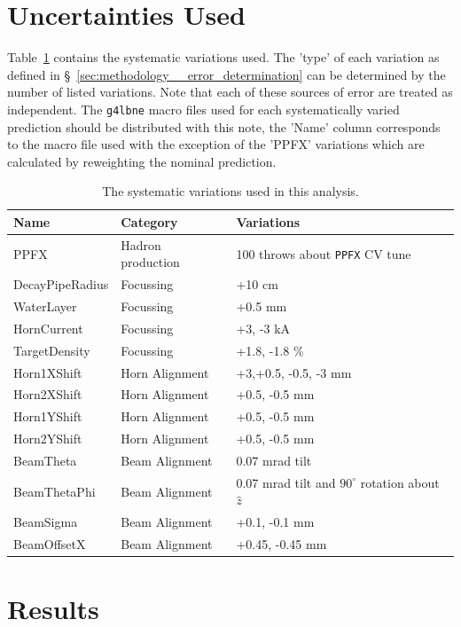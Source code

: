 \documentclass{article}
\begin{document}

\section{Uncertainties Used}
\label{sec:uncertainties_used}
Table~\ref{tbl:uncertdefn} contains the systematic variations used. The 'type' of each variation as defined in \S~\ref{sec:methodology__error_determination} can be determined by the number of listed variations. Note that each of these sources of error are treated as independent. The \texttt{g4lbne} macro files used for each systematically varied prediction should be distributed with this note, the 'Name' column corresponds to the macro file used with the exception of the 'PPFX' variations which are calculated by reweighting the nominal prediction.

\begin{table}
\centering
\begin{tabular}{l|l|l}
Name & Category & Variations \\
\hline
PPFX & Hadron production & 100 throws about \texttt{PPFX} CV tune \\
\hline
DecayPipeRadius & Focussing & +10 cm \\
WaterLayer & Focussing & +0.5 mm \\
HornCurrent & Focussing & +3, -3 kA \\
TargetDensity & Focussing & +1.8, -1.8 \% \\
\hline
Horn1XShift & Horn Alignment & +3,+0.5, -0.5, -3 mm\\
Horn2XShift & Horn Alignment & +0.5, -0.5 mm \\
Horn1YShift & Horn Alignment & +0.5, -0.5 mm \\
Horn2YShift & Horn Alignment & +0.5, -0.5 mm \\
\hline
BeamTheta & Beam Alignment & 0.07 mrad tilt \\
BeamThetaPhi & Beam Alignment & 0.07 mrad tilt and $90^{\circ}$ rotation about $\hat{z}$ \\
BeamSigma & Beam Alignment & +0.1, -0.1 mm \\
BeamOffsetX & Beam Alignment & +0.45, -0.45 mm \\
\end{tabular}
\caption{The systematic variations used in this analysis.}
\label{tbl:uncertdefn}
\end{table}

\section{Results}
\end{document}
